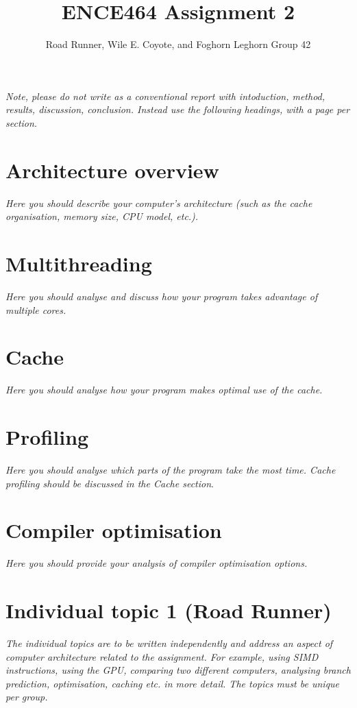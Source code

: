 \documentclass[a4paper,12pt]{article}
\title{ENCE464 Assignment 2}
\author{Road Runner, Wile E. Coyote, and Foghorn Leghorn Group 42}
\date{}
\newcommand{\comment}[1]{\emph{\color{blue}#1}}
\begin{document}
\maketitle

\comment{Note, please do not write as a conventional report with
  intoduction, method, results, discussion, conclusion.  Instead use
  the following headings, with a page per section.}


\section{Architecture overview}

\comment{Here you should describe your computer's architecture (such
  as the cache organisation, memory size, CPU model, etc.).}


\section{Multithreading}

\comment{Here you should analyse and discuss how your program takes
  advantage of multiple cores.}


\section{Cache}

\comment{Here you should analyse how your program makes optimal use
  of the cache.}


\section{Profiling}

\comment{Here you should analyse which parts of the program take the
  most time.  Cache profiling should be discussed in the Cache
  section}.


\section{Compiler optimisation}

\comment{Here you should provide your analysis of compiler
  optimisation options.}


\section{Individual topic 1 (Road Runner)}

\comment{The individual topics are to be written independently and
  address an aspect of computer architecture related to the
  assignment.  For example, using SIMD instructions, using the GPU,
  comparing two different computers, analysing branch prediction,
  optimisation, caching etc. in more detail.  The topics must be
  unique per group.}
\end{document}
